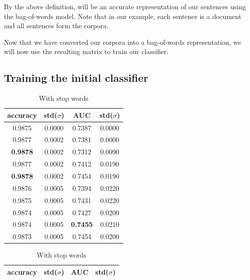 By the above definition,  will be an accurate representation
of our sentences using the bag-of-words model. Note that in our example, each sentence is a document
and all sentences form the corpora.

Now that we have converted our corpora into a bag-of-words representation, we will now use the
resulting matrix to train our classifier.

\subsection{Training the initial classifier}

\begin{table}
  \begin{subtable}{.5\linewidth}
    \centering
    \begin{tabular}{cccc} \toprule
      accuracy        & std($\sigma$) & AUC             & std($\sigma$) \\ \midrule
      0.9875          & 0.0000        & 0.7387          & 0.0000 \\
      0.9877          & 0.0002        & 0.7381          & 0.0000 \\
      \textbf{0.9878} & 0.0002        & 0.7312          & 0.0090 \\
      0.9877          & 0.0002        & 0.7412          & 0.0190 \\
      \textbf{0.9878} & 0.0002        & 0.7454          & 0.0190 \\ \midrule
      0.9876          & 0.0005        & 0.7394          & 0.0220 \\
      0.9875          & 0.0005        & 0.7431          & 0.0220 \\
      0.9874          & 0.0005        & 0.7427          & 0.0200 \\
      0.9874          & 0.0005        & \textbf{0.7455} & 0.0210 \\
      0.9873          & 0.0005        & 0.7454          & 0.0200 \\ \bottomrule
    \end{tabular}
      \caption{With stop words}
      \label{tab:data-with-stopwords}
  \end{subtable}
  \begin{subtable}{.5\linewidth}
    \centering
    \begin{tabular}{cccc} \toprule
      accuracy        & std($\sigma$) & AUC             & std($\sigma$) \\ \midrule

\end{tabular}
\end{subtable}
\end{table}
